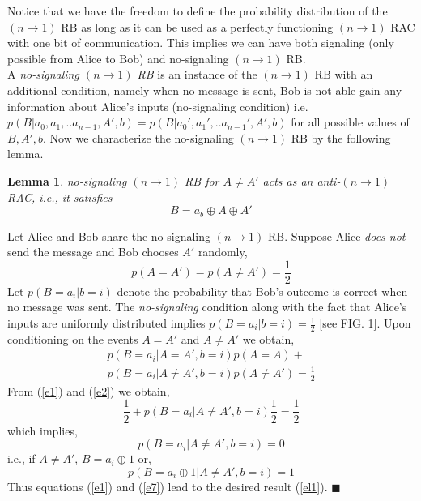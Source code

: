 \documentclass[%
 reprint,
 amsmath,amssymb,
 aps,
]{revtex4-1}
\newtheorem{mydef2}{Lemma}
\begin{document}
\noindent Notice that we have the freedom to define the probability distribution of the $(n\rightarrow 1)$ RB as long as it can be used as a perfectly functioning $(n\rightarrow 1)$ RAC with one bit of communication. This implies we can have both signaling (only possible from Alice to Bob) and no-signaling  $(n\rightarrow 1)$ RB. \\ A \textit{no-signaling $(n\rightarrow1)$ RB} is an instance of the $(n\rightarrow1)$ RB with an additional condition, namely when no message is sent, Bob is not able gain any information about Alice's inputs (no-signaling condition) i.e. $p(B|a_0,a_1,..a_{n-1},A',b)=p(B|a_0',a_1',..a_{n-1}',A',b)$ for all possible values of $B,A',b$. Now we characterize the no-signaling $(n\rightarrow 1)$ RB by the following lemma.
\begin{mydef2} \label{lem1}
no-signaling $(n\rightarrow 1)$ RB for $A\neq A'$ acts as an anti-$(n\rightarrow 1)$ RAC, i.e., it satisfies
\begin{equation} \label{el1}
B=a_b\oplus A \oplus A'
\end{equation}
\end{mydef2}
Let Alice and Bob share the no-signaling $(n\rightarrow 1)$ RB. Suppose Alice \textit{does not} send the message and Bob chooses $A'$ randomly, 
\begin{equation}\label{e2}
p(A=A')=p(A\neq A')=\frac{1}{2}
\end{equation}
Let $p(B=a_i|b=i)$ denote the probability that Bob's outcome is correct when no message was sent. The \textit{no-signaling} condition along with the fact that Alice's inputs are uniformly distributed implies $p(B=a_i|b=i)=\frac{1}{2}$ [see FIG. 1]. Upon conditioning on the events $A=A'$ and $A\neq A'$ we obtain, 
\begin{eqnarray}
p(B=a_i|A=A',b=i)p(A=A)+\nonumber \\ p(B=a_i|A\neq A',b=i)p(A\neq A')=\frac{1}{2}
\end{eqnarray}
From (\ref{e1}) and (\ref{e2}) we obtain, 
\begin{equation}
\frac{1}{2}+p(B=a_i|A\neq A',b=i)\frac{1}{2}=\frac{1}{2}
\end{equation}
which implies, 
\begin{equation}
p(B=a_i|A\neq A',b=i)=0
\end{equation}
i.e., if $A\neq A'$, $B=a_i\oplus 1$ or, 
\begin{equation} \label{e7}
p(B=a_i\oplus 1|A\neq A',b=i)=1
\end{equation}
Thus equations (\ref{e1}) and (\ref{e7}) lead to the desired result  (\ref{el1}). $\blacksquare$ \\
\end{document}
